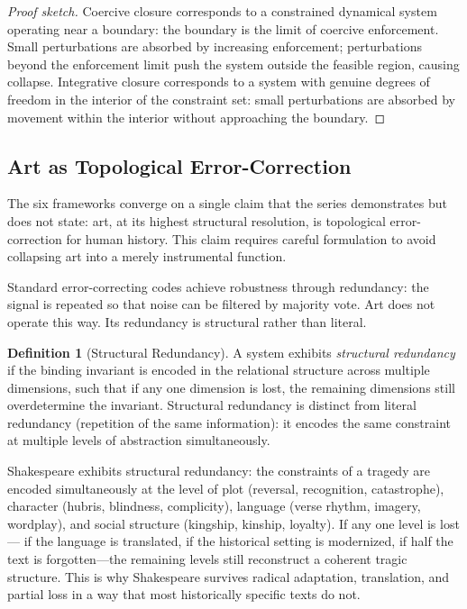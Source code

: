 \documentclass[12pt, oneside]{article}
\theoremstyle{plain}
\theoremstyle{definition}
\newtheorem{definition}[theorem]{Definition}
\theoremstyle{remark}
\begin{document}
\begin{proof}[Proof sketch]
Coercive closure corresponds to a constrained dynamical system
operating near a boundary: the boundary is the limit of coercive
enforcement. Small perturbations are absorbed by increasing
enforcement; perturbations beyond the enforcement limit push the
system outside the feasible region, causing collapse. Integrative
closure corresponds to a system with genuine degrees of freedom in
the interior of the constraint set: small perturbations are absorbed
by movement within the interior without approaching the boundary.
\end{proof}

\subsection{Art as Topological Error-Correction}

The six frameworks converge on a single claim that the series
demonstrates but does not state: art, at its highest structural
resolution, is topological error-correction for human history. This
claim requires careful formulation to avoid collapsing art into
a merely instrumental function.

Standard error-correcting codes achieve robustness through
redundancy: the signal is repeated so that noise can be filtered
by majority vote. Art does not operate this way. Its redundancy
is structural rather than literal.

\begin{definition}[Structural Redundancy]
A system exhibits \emph{structural redundancy} if the binding
invariant is encoded in the relational structure across multiple
dimensions, such that if any one dimension is lost, the remaining
dimensions still overdetermine the invariant. Structural redundancy
is distinct from literal redundancy (repetition of the same
information): it encodes the same constraint at multiple levels
of abstraction simultaneously.
\end{definition}

Shakespeare exhibits structural redundancy: the constraints of
a tragedy are encoded simultaneously at the level of plot
(reversal, recognition, catastrophe), character (hubris, blindness,
complicity), language (verse rhythm, imagery, wordplay), and social
structure (kingship, kinship, loyalty). If any one level is lost---
if the language is translated, if the historical setting is
modernized, if half the text is forgotten---the remaining levels
still reconstruct a coherent tragic structure. This is why
Shakespeare survives radical adaptation, translation, and partial
loss in a way that most historically specific texts do not.
\end{document}
